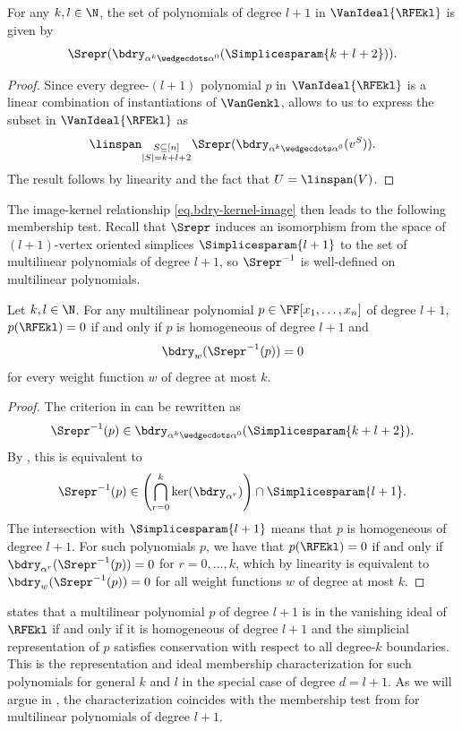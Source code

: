 \begin{corollary}
  \label{cor.simplicial-vangen}
  For any \(k,l \in \N\), the set of polynomials of degree $l+1$ in \(\VanIdeal{\RFEkl}\) is given by
  \[\Srepr(\bdry_{\alpha^k\wedgecdots\alpha^0}(\Simplicesparam{k+l+2})). \]
\end{corollary}
\begin{proof}
Since every degree-\((l+1)\) polynomial $p$ in \(\VanIdeal{\RFEkl}\) is a linear combination of instantiations of \(\VanGenkl\),  allows to us to express the subset in \(\VanIdeal{\RFEkl}\) as
\[\linspan_{\substack{S \subseteq [n]\\ |S|=k+l+2}} \Srepr(\bdry_{\alpha^k\wedgecdots\alpha^0}(v^S)).\]
The result follows by linearity and the fact that $U = \linspan(V)$. 
\end{proof}

The image-kernel relationship \eqref{eq.bdry-kernel-image} then leads to the following membership test. Recall that $\Srepr$ induces an isomorphism from the space of $(l+1)$-vertex oriented simplices $\Simplicesparam{l+1}$ to the set of multilinear polynomials of degree $l+1$, so $\Srepr^{-1}$ is well-defined on multilinear polynomials.
\begin{theorem}
  \label{thm.vanideal-char.base}
  Let \(k,l \in \N\).
  For any multilinear polynomial \(p\in\FF[x_1,\ldots,x_n]\) of
  degree \(l+1\),
  \(p(\RFEkl) = 0\) if and only if $p$ is homogeneous of degree $l+1$ and
  \[
    \bdry_w( \Srepr^{-1}(p) ) = 0
  \]
  for every weight function \(w\) of degree at most \(k\).
\end{theorem}
\begin{proof}
The criterion in  can be rewritten as 
\[ \Srepr^{-1}(p)\in \bdry_{\alpha^k\wedgecdots\alpha^0}(\Simplicesparam{k+l+2}). \]
By , this is equivalent to
\[ \Srepr^{-1}(p)\in \left(\bigcap_{r=0}^{k} \ker(\bdry_{\alpha^r})\right)\cap \Simplicesparam{l+1}. 
\]
The intersection with $\Simplicesparam{l+1}$ means that $p$ is homogeneous of degree $l+1$. For such polynomials $p$, we have that \(p(\RFEkl) = 0\) if and only if  \( \bdry_{\alpha^r}(\Srepr^{-1}(p))=0 \) for $r=0,\dots,k$, which by linearity is equivalent to \( \bdry_{w}(\Srepr^{-1}(p))=0 \) for all weight functions \(w\) of degree at most \(k\).
\end{proof}
 states that a multilinear polynomial $p$ of degree \(l+1\) is in the vanishing ideal of \(\RFEkl\) if and only if it is homogeneous of degree $l+1$ and the simplicial representation of $p$ satisfies conservation with respect to all degree-\(k\) boundaries. This is the representation and ideal membership characterization for such polynomials for general \(k\) and \(l\) in the special case of degree \(d = l+1\). As we will argue in , the characterization coincides with the membership test from  for multilinear polynomials of degree \(l+1\). 

